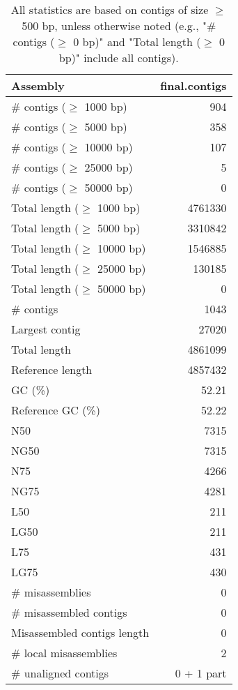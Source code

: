 \documentclass[12pt,a4paper]{article}
\begin{document}
\begin{table}[ht]
\begin{center}
\caption{All statistics are based on contigs of size $\geq$ 500 bp, unless otherwise noted (e.g., "\# contigs ($\geq$ 0 bp)" and "Total length ($\geq$ 0 bp)" include all contigs).}
\begin{tabular}{|l*{1}{|r}|}
\hline
Assembly & final.contigs \\ \hline
\# contigs ($\geq$ 1000 bp) & 904 \\ \hline
\# contigs ($\geq$ 5000 bp) & 358 \\ \hline
\# contigs ($\geq$ 10000 bp) & 107 \\ \hline
\# contigs ($\geq$ 25000 bp) & 5 \\ \hline
\# contigs ($\geq$ 50000 bp) & 0 \\ \hline
Total length ($\geq$ 1000 bp) & 4761330 \\ \hline
Total length ($\geq$ 5000 bp) & 3310842 \\ \hline
Total length ($\geq$ 10000 bp) & 1546885 \\ \hline
Total length ($\geq$ 25000 bp) & 130185 \\ \hline
Total length ($\geq$ 50000 bp) & 0 \\ \hline
\# contigs & 1043 \\ \hline
Largest contig & 27020 \\ \hline
Total length & 4861099 \\ \hline
Reference length & 4857432 \\ \hline
GC (\%) & 52.21 \\ \hline
Reference GC (\%) & 52.22 \\ \hline
N50 & 7315 \\ \hline
NG50 & 7315 \\ \hline
N75 & 4266 \\ \hline
NG75 & 4281 \\ \hline
L50 & 211 \\ \hline
LG50 & 211 \\ \hline
L75 & 431 \\ \hline
LG75 & 430 \\ \hline
\# misassemblies & 0 \\ \hline
\# misassembled contigs & 0 \\ \hline
Misassembled contigs length & 0 \\ \hline
\# local misassemblies & 2 \\ \hline
\# unaligned contigs & 0 + 1 part \\ \hline

\end{tabular}
\end{center}
\end{table}
\end{document}
